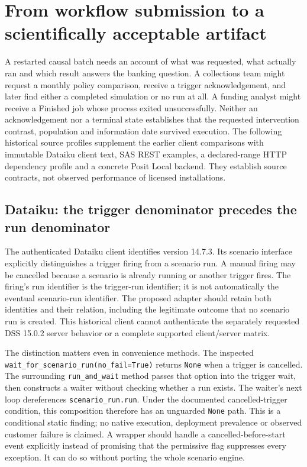 \section{From workflow submission to a scientifically acceptable artifact}
\label{sec:exec24-workflow-contracts}

A restarted causal batch needs an account of what was requested, what
actually ran and which result answers the banking question. A collections
team might request a monthly policy comparison, receive a trigger
acknowledgement, and later find either a completed simulation or no run at
all. A funding analyst might receive a Finished job whose process exited
unsuccessfully. Neither an acknowledgement nor a terminal state establishes
that the requested intervention contrast, population and information date
survived execution. The following historical source profiles supplement the
earlier client comparisons with immutable Dataiku client text, SAS REST
examples, a declared-range HTTP dependency profile and a concrete Posit
Local backend. They establish source contracts, not observed performance of
licensed installations.\citep{exec24_workflow_contracts_dataiku,
exec24_workflow_contracts_sas,exec24_workflow_contracts_domino,
exec24_workflow_contracts_posit}

\subsection{Dataiku: the trigger denominator precedes the run denominator}

The authenticated Dataiku client identifies version 14.7.3. Its scenario
interface explicitly distinguishes a trigger firing from a scenario run.
A manual firing may be cancelled because a scenario is already running or
another trigger fires. The firing's run identifier is the trigger-run
identifier; it is not automatically the eventual scenario-run identifier.
The proposed adapter should retain both identities and their relation,
including the legitimate outcome that no scenario run is created. This
historical client cannot authenticate the separately requested DSS 15.0.2
server behavior or a complete supported client/server matrix.
\citep{exec24_workflow_contracts_dataiku}

The distinction matters even in convenience methods. The inspected
\texttt{wait\_for\_scenario\_run(no\_fail=True)} returns \texttt{None}
when a trigger is cancelled. The surrounding \texttt{run\_and\_wait}
method passes that option into the trigger wait, then constructs a waiter
without checking whether a run exists. The waiter's next loop dereferences
\texttt{scenario\_run.run}. Under the documented cancelled-trigger
condition, this composition therefore has an unguarded \texttt{None} path.
This is a conditional static finding; no native execution, deployment
prevalence or observed customer failure is claimed. A wrapper should handle
a cancelled-before-start event explicitly instead of promising that the
permissive flag suppresses every exception. It can do so without porting
the whole scenario engine.\citep{exec24_workflow_contracts_dataiku}

